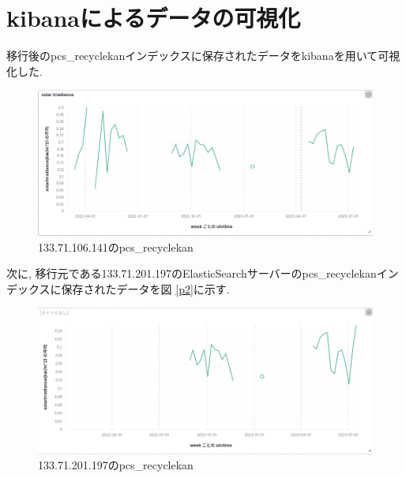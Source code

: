 \section{kibanaによるデータの可視化}

移行後のpcs\_recyclekanインデックスに保存されたデータをkibanaを用いて可視化した.


\begin{figure}[!ht]
    \begin{center}
        \includegraphics[width=160mm]{sotu/figure/1.png}
        \caption{133.71.106.141のpcs\_recyclekan}
        \label{p10}
    \end{center}
\end{figure}

次に, 移行元である133.71.201.197のElasticSearchサーバーのpcs\_recyclekanインデックスに保存されたデータを図 \ref{p2}に示す.

\begin{figure}[!ht]
    \begin{center}
        \includegraphics[width=160mm]{sotu/figure/2.png}
        \caption{133.71.201.197のpcs\_recyclekan}
        \label{p11}
    \end{center}
\end{figure}

